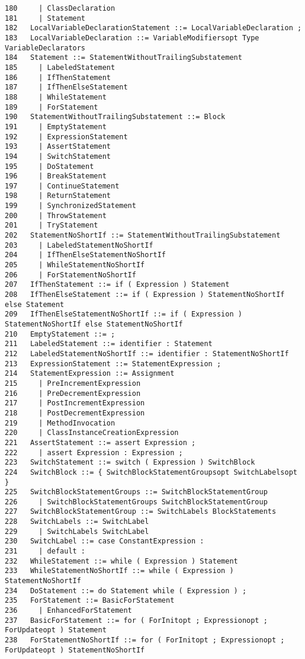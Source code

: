 {\begin{verbatim}
180     | ClassDeclaration
181     | Statement
182   LocalVariableDeclarationStatement ::= LocalVariableDeclaration ;
183   LocalVariableDeclaration ::= VariableModifiersopt Type VariableDeclarators
184   Statement ::= StatementWithoutTrailingSubstatement
185     | LabeledStatement
186     | IfThenStatement
187     | IfThenElseStatement
188     | WhileStatement
189     | ForStatement
190   StatementWithoutTrailingSubstatement ::= Block
191     | EmptyStatement
192     | ExpressionStatement
193     | AssertStatement
194     | SwitchStatement
195     | DoStatement
196     | BreakStatement
197     | ContinueStatement
198     | ReturnStatement
199     | SynchronizedStatement
200     | ThrowStatement
201     | TryStatement
202   StatementNoShortIf ::= StatementWithoutTrailingSubstatement
203     | LabeledStatementNoShortIf
204     | IfThenElseStatementNoShortIf
205     | WhileStatementNoShortIf
206     | ForStatementNoShortIf
207   IfThenStatement ::= if ( Expression ) Statement
208   IfThenElseStatement ::= if ( Expression ) StatementNoShortIf else Statement
209   IfThenElseStatementNoShortIf ::= if ( Expression ) StatementNoShortIf else StatementNoShortIf
210   EmptyStatement ::= ;
211   LabeledStatement ::= identifier : Statement
212   LabeledStatementNoShortIf ::= identifier : StatementNoShortIf
213   ExpressionStatement ::= StatementExpression ;
214   StatementExpression ::= Assignment
215     | PreIncrementExpression
216     | PreDecrementExpression
217     | PostIncrementExpression
218     | PostDecrementExpression
219     | MethodInvocation
220     | ClassInstanceCreationExpression
221   AssertStatement ::= assert Expression ;
222     | assert Expression : Expression ;
223   SwitchStatement ::= switch ( Expression ) SwitchBlock
224   SwitchBlock ::= { SwitchBlockStatementGroupsopt SwitchLabelsopt }
225   SwitchBlockStatementGroups ::= SwitchBlockStatementGroup
226     | SwitchBlockStatementGroups SwitchBlockStatementGroup
227   SwitchBlockStatementGroup ::= SwitchLabels BlockStatements
228   SwitchLabels ::= SwitchLabel
229     | SwitchLabels SwitchLabel
230   SwitchLabel ::= case ConstantExpression :
231     | default :
232   WhileStatement ::= while ( Expression ) Statement
233   WhileStatementNoShortIf ::= while ( Expression ) StatementNoShortIf
234   DoStatement ::= do Statement while ( Expression ) ;
235   ForStatement ::= BasicForStatement
236     | EnhancedForStatement
237   BasicForStatement ::= for ( ForInitopt ; Expressionopt ; ForUpdateopt ) Statement
238   ForStatementNoShortIf ::= for ( ForInitopt ; Expressionopt ; ForUpdateopt ) StatementNoShortIf

\end{verbatim}}

